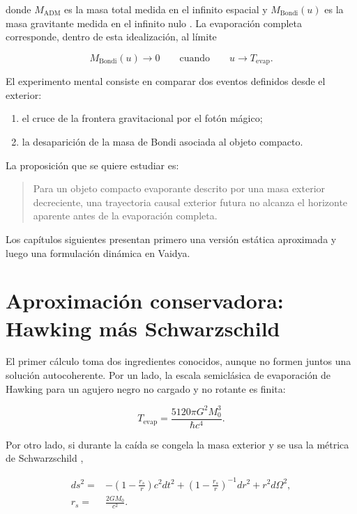 \documentclass[
aps,
prd,
reprint,
superscriptaddress,
nofootinbib,
amsmath,
amssymb
]{revtex4-2}
\begin{document}
donde $M_{\mathrm{ADM}}$ es la masa total medida en el infinito espacial y $M_{\mathrm{Bondi}}(u)$ es la masa gravitante medida en el infinito nulo \cite{ADM1962,Bondi1962,Sachs1962}. La evaporación completa corresponde, dentro de esta idealización, al límite

\begin{equation}
M_{\mathrm{Bondi}}(u)\rightarrow0
\qquad
\mathrm{cuando}
\qquad
u\rightarrow T_{\mathrm{evap}}.
\end{equation}

El experimento mental consiste en comparar dos eventos definidos desde el exterior:

\begin{enumerate}
\item el cruce de la frontera gravitacional por el fotón mágico;
\item la desaparición de la masa de Bondi asociada al objeto compacto.
\end{enumerate}

La proposición que se quiere estudiar es:

\begin{quote}
Para un objeto compacto evaporante descrito por una masa exterior decreciente, una trayectoria causal exterior futura no alcanza el horizonte aparente antes de la evaporación completa.
\end{quote}

Los capítulos siguientes presentan primero una versión estática aproximada y luego una formulación dinámica en Vaidya.

\section{Aproximación conservadora: Hawking más Schwarzschild}

El primer cálculo toma dos ingredientes conocidos, aunque no formen juntos una solución autocoherente. Por un lado, la escala semiclásica de evaporación de Hawking para un agujero negro no cargado y no rotante es finita:

\begin{equation}
T_{\mathrm{evap}}=
\frac{5120\pi G^2 M_0^3}{\hbar c^4}.
\label{eqEvapTime}
\end{equation}

Por otro lado, si durante la caída se congela la masa exterior y se usa la métrica de Schwarzschild \cite{Schwarzschild1916,MTW1973,Wald1984},

\begin{align}
ds^2={}&
-
\left(
1-\frac{r_s}{r}
\right)c^2dt^2
+
\left(
1-\frac{r_s}{r}
\right)^{-1}dr^2
+
r^2d\Omega^2,
\label{eqSchwarzschildMetric}
\\
r_s={}&
\frac{2GM_0}{c^2}.
\end{align}
\end{document}
